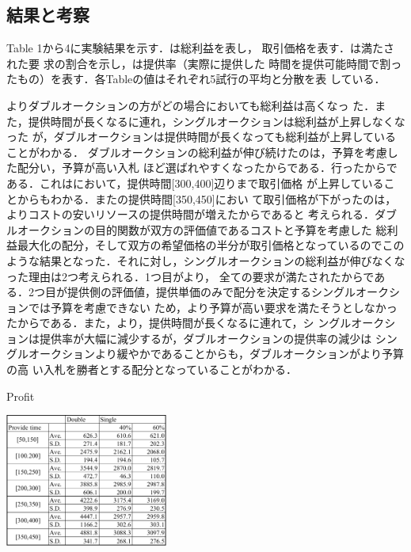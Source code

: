\documentclass{ujarticle}
\begin{document}
\subsection{結果と考察}
Table 1から4に実験結果を示す．は総利益を表し，
取引価格を表す．は満たされた要
求の割合を示し，は提供率（実際に提供した
時間を提供可能時間で割ったもの）を表す．各Tableの値はそれぞれ5試行の平均と分散を表
している．\par
{}よりダブルオークションの方がどの場合においても総利益は高くなっ
た．また，提供時間が長くなるに連れ，シングルオークションは総利益が上昇しなくなった
が，ダブルオークションは提供時間が長くなっても総利益が上昇していることがわかる．
ダブルオークションの総利益が伸び続けたのは，予算を考慮した配分い，予算が高い入札
ほど選ばれやすくなったからである．行ったからである．これはにおいて，提供時間[300,400]辺りまで取引価格
が上昇していることからもわかる．またの提供時間[350,450]におい
て取引価格が下がったのは，よりコストの安いリソースの提供時間が増えたからであると
考えられる．ダブルオークションの目的関数が双方の評価値であるコストと予算を考慮した
総利益最大化の配分，そして双方の希望価格の半分が取引価格となっているのでこのような結果となった．それに対し，シングルオークションの総利益が伸びなくなった理由は2つ考えられる．1つ目がより，
全ての要求が満たされたからである．2つ目が提供側の評価値，提供単価のみで配分を決定するシングルオークションでは予算を考慮できない
ため，より予算が高い要求を満たそうとしなかったからである．また，より，提供時間が長くなるに連れて，シ
ングルオークションは提供率が大幅に減少するが，ダブルオークションの提供率の減少は
シングルオークションより緩やかであることからも，ダブルオークションがより予算の高
い入札を勝者とする配分となっていることがわかる．
\begin{table}[H]
  \caption{Profit}
  \centering
  \includegraphics[width=0.4\textwidth]{profit.pdf} 
  \label{tab:profit}
\end{table}
\end{document}
